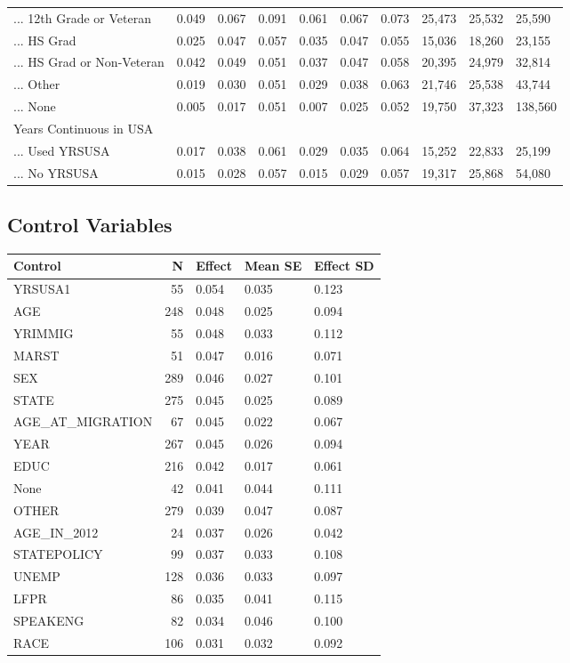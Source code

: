\documentclass[
  letterpaper,
  DIV=11,
  numbers=noendperiod]{scrartcl}
\begin{document}
\begin{table}[!htbp]
{\begin{tabular}{llllllllll}
... 12th Grade or Veteran & 0.049 & 0.067 & 0.091 & 0.061 & 0.067 & 0.073 & 25,473 & 25,532 & 25,590 \\ 
... HS Grad & 0.025 & 0.047 & 0.057 & 0.035 & 0.047 & 0.055 & 15,036 & 18,260 & 23,155 \\ 
... HS Grad or Non-Veteran & 0.042 & 0.049 & 0.051 & 0.037 & 0.047 & 0.058 & 20,395 & 24,979 & 32,814 \\ 
... Other & 0.019 & 0.030 & 0.051 & 0.029 & 0.038 & 0.063 & 21,746 & 25,538 & 43,744 \\ 
... None & 0.005 & 0.017 & 0.051 & 0.007 & 0.025 & 0.052 & 19,750 & 37,323 & 138,560 \\ 
Years Continuous in USA &  &  &  &  &  &  &  &  &  \\ 
... Used YRSUSA & 0.017 & 0.038 & 0.061 & 0.029 & 0.035 & 0.064 & 15,252 & 22,833 & 25,199 \\ 
... No YRSUSA & 0.015 & 0.028 & 0.057 & 0.015 & 0.029 & 0.057 & 19,317 & 25,868 & 54,080\\ 
\hline
\hline
\end{tabular}
}
\end{table}

\hypertarget{control-variables}{%
\subsection{Control Variables}\label{control-variables}}

\begin{tabular}{lrlll}
\toprule
Control & N & Effect & Mean SE & Effect SD\\
\midrule
YRSUSA1 & 55 & 0.054 & 0.035 & 0.123\\
AGE & 248 & 0.048 & 0.025 & 0.094\\
YRIMMIG & 55 & 0.048 & 0.033 & 0.112\\
MARST & 51 & 0.047 & 0.016 & 0.071\\
SEX & 289 & 0.046 & 0.027 & 0.101\\
\addlinespace
STATE & 275 & 0.045 & 0.025 & 0.089\\
AGE\_AT\_MIGRATION & 67 & 0.045 & 0.022 & 0.067\\
YEAR & 267 & 0.045 & 0.026 & 0.094\\
EDUC & 216 & 0.042 & 0.017 & 0.061\\
None & 42 & 0.041 & 0.044 & 0.111\\
\addlinespace
OTHER & 279 & 0.039 & 0.047 & 0.087\\
AGE\_IN\_2012 & 24 & 0.037 & 0.026 & 0.042\\
STATEPOLICY & 99 & 0.037 & 0.033 & 0.108\\
UNEMP & 128 & 0.036 & 0.033 & 0.097\\
LFPR & 86 & 0.035 & 0.041 & 0.115\\
\addlinespace
SPEAKENG & 82 & 0.034 & 0.046 & 0.100\\
RACE & 106 & 0.031 & 0.032 & 0.092\\
\bottomrule
\end{tabular}
\end{document}
